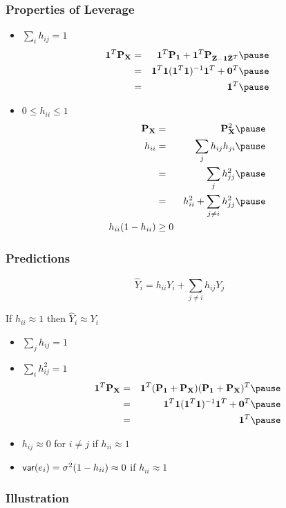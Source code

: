 \documentclass[]{beamer}
\begin{document}
\begin{frame}
  \frametitle{Properties of Leverage}
  \begin{itemize}
  \item $\sum_i h_{ij} = 1$  \pause
    \begin{eqnarray*}
 \one^T\P_\X &  = &  \one^T \P_\one + \one^T \P_{\Z - \one \bar{\Z}^T}
  \pause \\
 & = & \one^T \one (\one^T\one)^{-1} \one^T + \zero^T   \pause \\
 & = &    \one^T  \pause
    \end{eqnarray*}

  \item  $ 0 \leq h_{ii} \leq 1$  \pause
    \begin{eqnarray*}
     \P_\X &  = &\P_\X^2  \pause\\
    h_{ii} & = & \sum_j h_{ij} h_{ji} \pause \\
          & = & \sum_j h_{jj}^2  \pause \\
          & = & h_{ii}^2 +  \sum_{j \neq i} h_{jj}^2   \pause \\
h_{ii}(1 - h_{ii}) & \geq 0
    \end{eqnarray*}
  \end{itemize}
  \end{frame}

  \begin{frame}
    \frametitle{Predictions}
$$\hat{Y}_i =  h_{ii} Y_i  + \sum_{j \neq i} h_{ij} Y_j$$  \pause


If $h_{ii} \approx 1$ then $  \hat{Y}_i   \approx Y_i$   \pause
  
    \begin{itemize}
\item $\sum_j h_{ij} = 1$  \pause
\item $\sum_i h_{ij}^2 = 1$  \pause
    \begin{eqnarray*}
 \one^T\P_\X &  = &   \one^T (\P_\one + \P_\X)(\P_\one + \P_\X)^T
 \pause  \\
 & = & \one^T \one (\one^T\one)^{-1} \one^T + \zero^T   \pause \\
 & = &    \one^T  \pause
\end{eqnarray*}
\item $h_{ij} \approx 0$ for $i \neq j$ if $h_{ii} \approx 1$  \pause

\item $\textsf{var}(e_i) = \sigma^2 (1 - h_{ii}) \approx 0$ if $h_{ii} \approx 1$ 
   
    \end{itemize}
  \end{frame}
  \begin{frame}
    \frametitle{Illustration}
    
  \end{frame}
\end{document}
